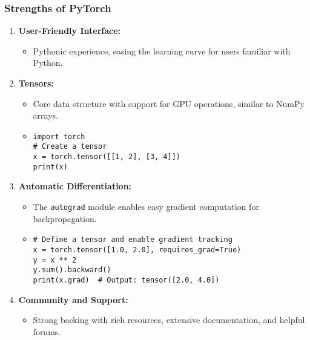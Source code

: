 \documentclass[aspectratio=169]{beamer}
\begin{document}
\begin{frame}[fragile]
    \frametitle{Strengths of PyTorch}
    \begin{enumerate}
        \item \textbf{User-Friendly Interface:} 
            \begin{itemize}
                \item Pythonic experience, easing the learning curve for users familiar with Python.
            \end{itemize}
        \item \textbf{Tensors:} 
            \begin{itemize}
                \item Core data structure with support for GPU operations, similar to NumPy arrays.
                \item \begin{lstlisting}
import torch
# Create a tensor
x = torch.tensor([[1, 2], [3, 4]])
print(x)
                \end{lstlisting}
            \end{itemize}
        \item \textbf{Automatic Differentiation:} 
            \begin{itemize}
                \item The \texttt{autograd} module enables easy gradient computation for backpropagation.
                \item \begin{lstlisting}
# Define a tensor and enable gradient tracking
x = torch.tensor([1.0, 2.0], requires_grad=True)
y = x ** 2
y.sum().backward()
print(x.grad)  # Output: tensor([2.0, 4.0])
                \end{lstlisting}
            \end{itemize}
        \item \textbf{Community and Support:} 
            \begin{itemize}
                \item Strong backing with rich resources, extensive documentation, and helpful forums.
            \end{itemize}
    \end{enumerate}
\end{frame}
\end{document}

